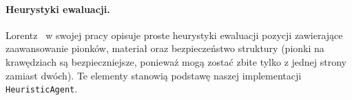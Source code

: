 \paragraph{Heurystyki ewaluacji.}
Lorentz~\cite{lorentz2011breakthrough} w swojej pracy opisuje proste heurystyki ewaluacji
pozycji zawierające zaawansowanie pionków, materiał oraz bezpieczeństwo
struktury (pionki na krawędziach są bezpieczniejsze, ponieważ mogą zostać
zbite tylko z jednej strony zamiast dwóch). Te elementy stanowią podstawę
naszej implementacji \texttt{HeuristicAgent}.
